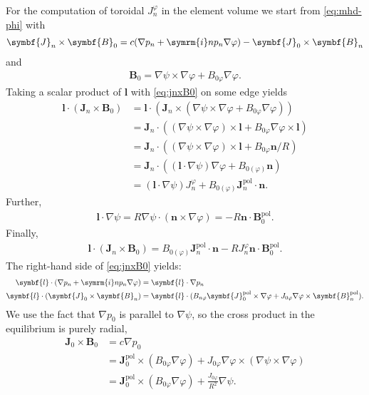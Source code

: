 \documentclass[a4paper, twoside, 10pt, english]{article}
\numberwithin{equation}{section}
\let\temp\varrho
\let\varrho\rho
\let\rho\temp
\let\temp\vartheta
\let\vartheta\theta
\let\theta\temp
\let\temp\varphi
\let\varphi\phi
\let\phi\temp
\let\vec\symbf
\newcommand*\grad{\ensuremath{\nabla}}
\newcommand*\im{\ensuremath{\symrm{i}}}  %
\newcommand*\pol{\ensuremath{\textrm{pol}}}  %
\begin{document}
For the computation of toroidal $J_{n}^{\phi}$ in the element volume we start from \cref{eq:mhd-phi} with
\begin{gather}
  \vec{J}_{n} \times \vec{B}_{0} = c (\grad p_{n} + \im n p_{n} \grad \phi) - \vec{J}_{0} \times \vec{B}_{n} \label{eq:jnxB0}
\end{gather}
and
\begin{gather}
  \vec{B}_{0} = \grad \psi \times \grad \phi + B_{0 \phi} \grad \phi.
\end{gather}
Taking a scalar product of $\vec{l}$ with \cref{eq:jnxB0} on some edge yields
\begin{align}
  \vec{l} \cdot (\vec{J}_{n} \times \vec{B}_{0}) &= \vec{l} \cdot (\vec{J}_{n} \times (\grad \psi \times \grad \phi + B_{0 \phi} \grad \phi)) \nonumber \\
  &= \vec{J}_{n} \cdot ((\grad \psi \times \grad \phi) \times \vec{l} + B_{0 \phi} \grad \phi \times \vec{l}) \nonumber \\
  &= \vec{J}_{n} \cdot ((\grad \psi \times \grad \phi) \times \vec{l} + B_{0 \phi} \vec{n} / R) \nonumber \\
  &= \vec{J}_{n} \cdot \left( (\vec{l} \cdot \grad \psi) \grad \phi + B_{0 (\phi)} \vec{n} \right) \nonumber \\
  &= (\vec{l} \cdot \grad \psi) J_{n}^{\phi} + B_{0 (\phi)} \vec{J}_{n}^{\pol} \cdot \vec{n}.
\end{align}
Further,
\begin{gather}
  \vec{l} \cdot \grad \psi = R \grad \psi \cdot \left( \vec{n} \times \grad \phi \right) = -R \vec{n} \cdot \vec{B}_{0}^{\pol}.
\end{gather}
Finally,
\begin{gather}
  \vec{l} \cdot (\vec{J}_{n} \times \vec{B}_{0}) = B_{0 (\phi)} \vec{J}_{n}^{\pol} \cdot \vec{n} - R J_{n}^{\phi} \vec{n} \cdot \vec{B}_{0}^{\pol}.
\end{gather}
The right-hand side of \cref{eq:jnxB0} yields:
\begin{align}
  \vec{l} \cdot (\grad p_{n} + \im n p_{n} \grad \phi) &= \vec{l} \cdot \grad p_{n} \\
  \vec{l} \cdot (\vec{J}_{0} \times \vec{B}_{n}) &= \vec{l} \cdot (B_{n \phi} \vec{J}_{0}^{\pol} \times \grad \phi + J_{0 \phi} \grad \phi \times \vec{B}_{n}^{\pol}).
\end{align}
We use the fact that $\grad p_{0}$ is parallel to $\grad \psi$, so the cross product in the equilibrium is purely radial,
\begin{align}
  \vec{J}_{0} \times \vec{B}_{0} &= c \grad p_{0} \nonumber \\
  &= \vec{J}_{0}^{\pol} \times (B_{0 \phi} \grad \phi) + J_{0 \phi} \grad \phi \times (\grad \psi \times \grad \phi) \nonumber \\
  &= \vec{J}_{0}^{\pol} \times (B_{0 \phi} \grad \phi) + \frac{J_{0 \phi}}{R^{2}} \grad \psi.
\end{align}
\end{document}
